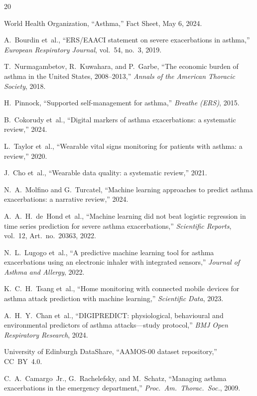 \documentclass[11pt,a4paper]{article}
\begin{document}
\begin{thebibliography}{20}

World Health Organization, ``Asthma,'' Fact Sheet, May 6, 2024.

A.~Bourdin et~al., ``ERS/EAACI statement on severe exacerbations in asthma,''
\emph{European Respiratory Journal}, vol.~54, no.~3, 2019.

T.~Nurmagambetov, R.~Kuwahara, and P.~Garbe, ``The economic burden of asthma
in the United States, 2008--2013,'' \emph{Annals of the American Thoracic
Society}, 2018.

H.~Pinnock, ``Supported self-management for asthma,'' \emph{Breathe (ERS)},
2015.

B.~Cokorudy et~al., ``Digital markers of asthma exacerbations: a systematic
review,'' 2024.

L.~Taylor et~al., ``Wearable vital signs monitoring for patients with asthma:
a review,'' 2020.

J.~Cho et~al., ``Wearable data quality: a systematic review,'' 2021.

N.~A.~Molfino and G.~Turcatel, ``Machine learning approaches to predict asthma
exacerbations: a narrative review,'' 2024.

A.~A.~H.~de~Hond et~al., ``Machine learning did not beat logistic regression
in time series prediction for severe asthma exacerbations,'' \emph{Scientific
Reports}, vol.~12, Art.~no.~20363, 2022.

N.~L.~Lugogo et~al., ``A predictive machine learning tool for asthma
exacerbations using an electronic inhaler with integrated sensors,''
\emph{Journal of Asthma and Allergy}, 2022.

K.~C.~H.~Tsang et~al., ``Home monitoring with connected mobile devices for
asthma attack prediction with machine learning,'' \emph{Scientific Data},
2023.

A.~H.~Y.~Chan et~al., ``DIGIPREDICT: physiological, behavioural and
environmental predictors of asthma attacks---study protocol,'' \emph{BMJ Open
Respiratory Research}, 2024.

University of Edinburgh DataShare, ``AAMOS-00 dataset repository,'' CC~BY~4.0.

C.~A.~Camargo~Jr., G.~Rachelefsky, and M.~Schatz, ``Managing asthma
exacerbations in the emergency department,'' \emph{Proc.\ Am.\ Thorac.\
Soc.}, 2009.


\end{thebibliography}
\end{document}
